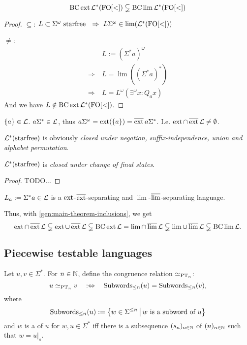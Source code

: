 \begin{theorem}
\[ \operatorname{BC} \operatorname{ext} \mathcal{L}^*( \mathrm{FO[<]} ) \subsetneqq \operatorname{BC} \lim \mathcal{L}^* ( \mathrm{FO[<]} ) \]
\begin{proof}
$\subseteq$: $L \subset \Sigma^\omega \text{ starfree } \ \Rightarrow\ L \Sigma^\omega \in \lim( \Lang^*( \mathrm{FO[<]} ) )$

$\neq$:
\begin{align*}
& L := (\Sigma^* a)^\omega \\
\Rightarrow \ & L = \lim( (\Sigma^* a)^* ) \\
\Rightarrow \ & L = L^\omega(\exists^\omega x : Q_a x)
\end{align*}
And we have $L \notin \operatorname{BC} \operatorname{ext} \mathcal{L}^* (\mathrm{FO[<]})$.
\end{proof}
\end{theorem}

$\Set{a} \in \Lang$. $a \Sigma^* \in \mathcal{L}$, thus $a\Sigma^\omega = \ext(\Set{a}) = \dext{a\Sigma^*}$. I.e. $\operatorname{ext} \cap \operatorname{\overline{ext}} \mathcal{L} \ne \emptyset$.

$\mathcal{L}^*(\textup{\textrm{starfree}})$ is obviously \emph{closed under negation, suffix-independence, union and alphabet permutation}.

\begin{lemma}
$\mathcal{L}^*(\textup{\textrm{starfree}})$ is \emph{closed under change of final states}.
\begin{proof}
TODO...
\end{proof}
\end{lemma}

$L_a := \Sigma^* a \in \mathcal{L}$ is a $\operatorname{ext}$-$\operatorname{\overline{ext}}$-separating and $\lim$-$\operatorname{\overline{lim}}$-separating language.

Thus, with \cref{gen:main-theorem-inclusions}, we get
\[ \operatorname{ext} \cap \operatorname{\overline{ext}} \mathcal{L} \subsetneqq
\operatorname{ext} \cup \operatorname{\overline{ext}} \mathcal{L} \subsetneqq
\operatorname{BC} \operatorname{ext} \mathcal{L} =
\lim \cap \operatorname{\overline{lim}} \mathcal{L} \subsetneqq
\lim \cup \operatorname{\overline{lim}} \mathcal{L} \subsetneqq
\operatorname{BC} \lim \mathcal{L} . \]


\subsection{Piecewise testable languages}
\label{lang:PT}
Let $u,v \in \Sigma^*$. For $n \in \mathbb{N}$, define the congruence relation $\simeq_{\textup{\textrm{PT}}_n}$:
\[ u \simeq_{\PT_n} v \ \ \ :\Leftrightarrow \ \ \ \operatorname{Subwords}_{\le n}(u) = \operatorname{Subwords}_{\le n}(v) , \]
where
\[ \operatorname{Subwords}_{\le n}(u) := \Set{w \in \Sigma^{\le n}}{\text{$w$ is a subword of $u$}} \]
and $w$ is a  of $u$ for $w,u \in \Sigma^*$ iff there is a subsequence $(s_n)_{n\in\mathbb{N}}$ of $(n)_{n\in\mathbb{N}}$ such that $w = u|_s$.


